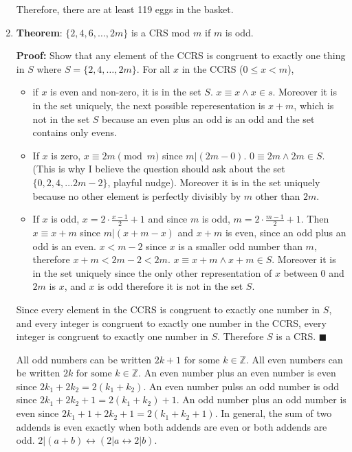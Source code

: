 \documentclass[12pt,letterpaper]{article}
\newcommand{\fs}{\textrm{\ for some\ }}
\newcommand{\qedhere}{{\tiny \(\blacksquare\)}}
\begin{document}
\begin{enumerate}[leftmargin=0mm]
Therefore, there are at least 119 eggs in the basket.

\item \textbf{Theorem}: \(\{2, 4, 6, \dots, 2m\}\) is a CRS mod \(m\) if \(m\) is odd.

\textbf{Proof:} Show that any element of the CCRS is congruent to exactly one thing in \(S\) where \(S = \{2, 4, \dots, 2m\}\). For all \(x\) in the CCRS (\(0 \leq x < m\)),

\begin{itemize}
\item if \(x\) is even and non-zero, it is in the set  \(S\). \(x \equiv x \wedge x \in s\). Moreover it is in the set uniquely, the next possible reperesentation is \(x + m\), which is not in the set \(S\) because an even plus an odd is an odd and the set contains only evens.
\item If \(x\) is zero, \(x \equiv 2m \pmod m\) since \(m | (2m - 0)\). \(0 \equiv 2m \wedge 2m \in S\). (This is why I believe the question should ask about the set \(\{0, 2, 4, \dots 2m - 2\}\), playful nudge). Moreover it is in the set uniquely because no other element is perfectly divisibly by \(m\) other than \(2m\).
\item If \(x\) is odd, \(x = 2 \cdot \frac{x-1}{2} + 1\) and since \(m\) is odd, \(m = 2 \cdot \frac{m-1}{2} + 1\). Then \(x \equiv x + m\) since \(m | (x + m - x)\) and \(x + m\) is even, since an odd plus an odd is an even. \(x < m - 2\) since \(x\) is a smaller odd number than \(m\), therefore \(x + m < 2m - 2 < 2m\). \(x \equiv x + m \wedge x + m \in S\). Moreover it is in the set uniquely since the only other representation of \(x\) between \(0\) and \(2m\) is \(x\), and \(x\) is odd therefore it is not in the set \(S\).
\end{itemize}

Since every element in the CCRS is congruent to exactly one number in \(S\), and every integer is congruent to exactly one number in the CCRS, every integer is congruent to exactly one number in \(S\). Therefore \(S\) is a CRS. \qedhere

All odd numbers can be written \(2k + 1 \fs k \in \mathbb Z\). All even numbers can be written \(2k \fs k \in \mathbb Z\). An even number plus an even number is even since \(2 k_1 + 2 k_2 = 2(k_1 + k_2)\). An even number pulss an odd number is odd since \(2k_1 + 2k_2 + 1 = 2(k_1 + k_2) + 1\). An odd number plus an odd number is even since \(2k_1 + 1 + 2k_2 + 1 = 2(k_1 + k_2 + 1)\). In general, the sum of two addends is even exactly when both addends are even or both addends are odd. \(2|(a + b) \leftrightarrow (2|a \leftrightarrow 2|b)\).


\end{enumerate}
\end{document}

